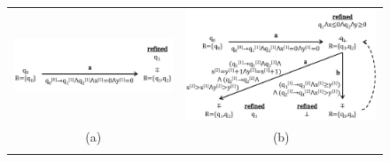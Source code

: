 \documentclass[10pt,conference,letterpaper,twocolumn]{IEEEtran}
\begin{document}
\begin{figure}[t!]
\begin{tabular}{cc}
\includegraphics[scale=0.42]{figures/IM1.pdf} & \includegraphics[scale=0.42]{figures/IM2.pdf} \\
\footnotesize{(a)} & \footnotesize{(b)} \\
\\

\end{tabular}
\end{figure}
\end{document}
